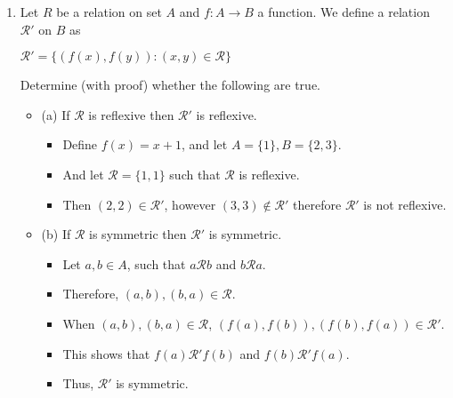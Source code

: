 \documentclass[letterpaper,12pt]{article}
\begin{document}
\begin{enumerate}
\item Let $R$ be a relation on set $A$ and $f: A \rightarrow B$ a function. We define a relation $\mathcal{R'}$ on $B$ as 
\begin{center}
	$\mathcal{R'} = \{(f(x),f(y)) : (x,y) \in \mathcal{R}\}$
\end{center}
Determine (with proof) whether the following are true.
\begin{itemize}
	\item (a) If $\mathcal{R}$ is reflexive then $\mathcal{R'}$ is reflexive.
	\begin{itemize}
	\item Define $f(x)=x+1$, and let $A=\{1\},B=\{2,3\}$.
	\item And let $\mathcal{R}=\{1,1\}$ such that $\mathcal{R}$ is reflexive.
	\item Then $(2,2) \in \mathcal{R'}$, however $(3,3) \notin \mathcal{R'}$ therefore $\mathcal{R'}$ is not reflexive.
	\end{itemize}
	\item (b) If $\mathcal{R}$ is symmetric then $\mathcal{R'}$ is symmetric.
	\begin{itemize}
	\item Let $a,b \in A$, such that $a \mathrel \mathcal{R} b$ and $b \mathrel \mathcal{R} a$.
	\item Therefore, $(a,b),(b,a) \in \mathcal{R}$.
	\item When $(a,b),(b,a) \in \mathcal{R}$, $(f(a),f(b)),(f(b),f(a)) \in \mathcal{R'}$.
	\item This shows that $f(a) \mathrel \mathcal R' f(b) $ and $f(b) \mathrel \mathcal R' f(a)$.
	\item Thus, $\mathcal R' $ is symmetric.
	\end{itemize}
\end{itemize}


\end{enumerate}
\end{document}
